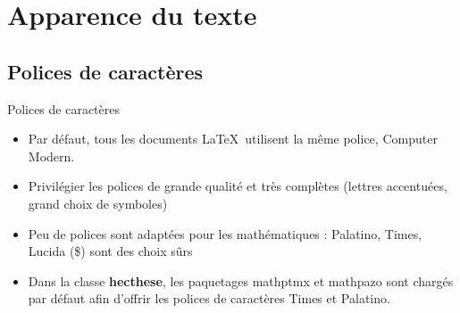 
\section{Apparence du texte}

\subsection{Polices de caractères}

\begin{frame}{Polices de caractères}
	\begin{itemize}
		\item Par défaut, tous les documents \LaTeX\ utilisent la même police, \textrm{Computer Modern}.
		\item Privilégier les polices de grande qualité et très complètes (lettres accentuées, grand choix de symboles)
		\item Peu de polices sont adaptées pour les mathématiques : Palatino, Times, Lucida (\$) sont des choix sûrs
		\item Dans la classe \textbf{hecthese}, les paquetages mathptmx et mathpazo sont chargés par défaut afin	d’offrir les polices de caractères Times et Palatino.
	\end{itemize}
\end{frame}

